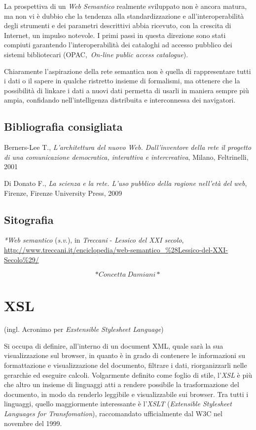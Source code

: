 \documentclass[
  b5paper,
  twoside,
  12pt,
  chapterprefix=false,
  bibliography=totocnumbered,
  parskip=false]{scrbook}
\begin{document}
La prospettiva di un \emph{Web Semantico} realmente sviluppato non è ancora
matura, ma non vi è dubbio che la tendenza alla standardizzazione e
all'interoperabilità degli strumenti e dei parametri descrittivi abbia
ricevuto, con la crescita di Internet, un impulso notevole. I primi
passi in questa direzione sono stati compiuti garantendo
l'interoperabilità dei cataloghi ad accesso pubblico dei sistemi
bibliotecari (OPAC,~\emph{On-line public access catalogue}).

Chiaramente l'aspirazione della rete semantica non è quella di
rappresentare tutti i dati o il sapere in qualche ristretto insieme di
formalismi, ma ottenere che la possibilità di linkare i dati a nuovi
dati permetta di usarli in maniera sempre più ampia, confidando
nell'intelligenza distribuita e interconnessa dei navigatori.

\hypertarget{bibliografia-consigliata-26}{%
\section*{Bibliografia consigliata}\label{bibliografia-consigliata-26}}

Berners-Lee T., \emph{L'architettura del nuovo Web. Dall'inventore della
rete il progetto di una comunicazione democratica, interattiva e
intercreativa}, Milano, Feltrinelli, 2001

Di Donato F., \emph{La scienza e la rete. L'uso pubblico della ragione
nell'età del web}, Firenze, Firenze University Press, 2009

\hypertarget{sitografia-33}{%
\section*{Sitografia}\label{sitografia-33}}

\emph{*Web semantico} (\emph{s.v}.), in \emph{Treccani} - \emph{Lessico del XXI secolo},
\url{http://www.treccani.it/enciclopedia/web-semantico_\%28Lessico-del-XXI-Secolo\%29/}

\[*Concetta~Damiani*\]

\hypertarget{xsl}{%
\chapter{XSL}\label{xsl}}

(ingl. Acronimo per \emph{Exstensible Stylesheet Language})

Si occupa di definire, all'interno di un document XML, quale sarà la sua
visualizzazione sul browser, in quanto è in grado di contenere le
informazioni su formattazione e visualizzazione del documento, filtrare
i dati, riorganizzarli nelle gerarchie ed eseguire calcoli. Volgarmente
definito come foglio di stile, l'\emph{XSL} è più che altro un insieme di
linguaggi atti a rendere possibile la trasformazione del documento, in
modo da renderlo leggibile e visualizzabile sui browser. Tra tutti i
linguaggi, quello maggiormente interessante è l'\emph{XSLT} (\emph{Extensible
Stylesheet Languages for Transfomation}), raccomandato ufficialmente dal
W3C nel novembre del 1999.
\end{document}
